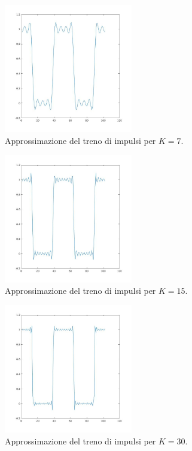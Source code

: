 \documentclass[12pt,oneside,openany]{memoir}
\numberwithin{equation}{subsection}
\begin{document}
\begin{figure}[H]
\centering
\captionsetup{justification=centering}
\includegraphics[width=0.5\textwidth]{images/matlab_approssimazione_2.jpg}
\caption{Approssimazione del treno di impulsi per $K = 7$.}
\end{figure}
\begin{figure}[H]
\centering
\captionsetup{justification=centering}
\includegraphics[width=0.5\textwidth]{images/matlab_approssimazione_3.jpg}
\caption{Approssimazione del treno di impulsi per $K = 15$.}
\end{figure}
\begin{figure}[H]
\centering
\captionsetup{justification=centering}
\includegraphics[width=0.5\textwidth]{images/matlab_approssimazione_4.jpg}
\caption{Approssimazione del treno di impulsi per $K = 30$.}
\end{figure}
\end{document}
